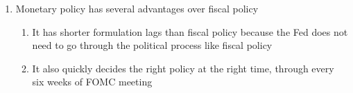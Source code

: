 \documentclass[12pt]{article}
\begin{document}
\begin{enumerate}
\begin{enumerate}
\begin{enumerate}
            \end{enumerate}

          \item Monetary policy has several advantages over fiscal policy

            \begin{enumerate}

              \item It has shorter formulation lags than fiscal policy because the Fed does not need to go through the political process like fiscal policy

              \item It also quickly decides the right policy at the right time, through every six weeks of FOMC meeting

            \end{enumerate}

        \end{enumerate}

    \end{enumerate}
\end{document}
